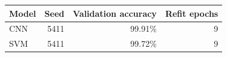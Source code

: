 \begin{center}\begin{tabular}{lrrr}
\toprule
Model & Seed & Validation accuracy & Refit epochs \\\midrule
CNN & 5411 & 99.91\% & 9 \\
SVM & 5411 & 99.72\% & 9 \\
\bottomrule\end{tabular}\end{center}
